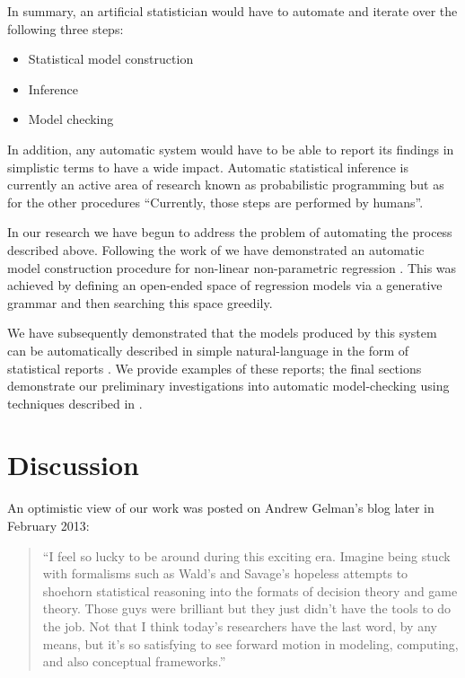 \documentclass{article} %
\begin{document}
In summary, an artificial statistician would have to automate and iterate over the following three steps:
\begin{itemize}
  \item Statistical model construction
  \item Inference
  \item Model checking
\end{itemize}

In addition, any automatic system would have to be able to report its findings in simplistic terms to have a wide impact.
Automatic statistical inference is currently an active area of research known as probabilistic programming but as for the other procedures ``Currently, those steps are performed by humans''.

In our research we have begun to address the problem of automating the process described above.
Following the work of \cite{grosse2012exploiting} we have demonstrated an automatic model construction procedure for non-linear non-parametric regression \citep{DuvLloGroetal13}.
This was achieved by defining an open-ended space of regression models via a generative grammar and then searching this space greedily.

We have subsequently demonstrated that the models produced by this system can be automatically described in simple natural-language in the form of statistical reports \citep{LloDuvGroetal13}.
We provide examples of these reports; the final sections demonstrate our preliminary investigations into automatic model-checking using techniques described in \cite{gelman1996posterior}.

\section{Discussion}

An optimistic view of our work was posted on Andrew Gelman's blog later in February 2013:
\begin{quotation}
``I feel so lucky to be around during this exciting era.
Imagine being stuck with formalisms such as Wald's and Savage's hopeless attempts to shoehorn statistical reasoning into the formats of decision theory and game theory.
Those guys were brilliant but they just didn't have the tools to do the job.
Not that I think today's researchers have the last word, by any means, but it's so satisfying to see forward motion in modeling, computing, and also conceptual frameworks.''
\end{quotation}
\end{document}
